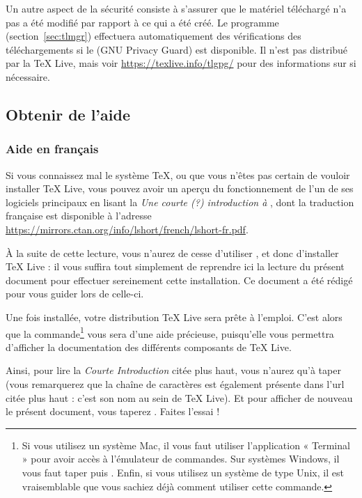 \documentclass[german, english, french]{article}
\renewcommand{\TL}{\TeX{} Live\xspace}%
\begin{document}
Un autre aspect de la sécurité consiste à s'assurer que le matériel téléchargé
n'a pas a été modifié par rapport à ce qui a été créé. Le programme 
(section~\ref{sec:tlmgr}) effectuera automatiquement des vérifications des
téléchargements si le  (GNU Privacy Guard) est disponible. Il n'est
pas distribué par la \TL, mais voir \url{https://texlive.info/tlgpg/} pour des
informations sur  si nécessaire.

\subsection{Obtenir de l'aide}
\label{sec:help}
\subsubsection{Aide en français}
Si vous connaissez mal le système \TeX{}, ou que vous n'êtes pas certain de
vouloir installer \TL{}, vous pouvez avoir un aperçu du fonctionnement de l'un
de ses logiciels principaux en lisant la \emph{Une courte (\string?)
  introduction à \LaTeXe{}}, dont la traduction française est disponible
à l'adresse \url{https://mirrors.ctan.org/info/lshort/french/lshort-fr.pdf}.

À la suite de cette lecture, vous n'aurez de cesse d'utiliser \LaTeXe{}, et donc
d'installer \TL{} : il vous suffira tout simplement de reprendre ici la lecture
du présent document pour effectuer sereinement cette installation.  Ce document
a été rédigé pour vous guider lors de celle-ci.

Une fois installée, votre distribution \TL{} sera prête à l'emploi.  C'est alors
que la commande\footnote{Si vous utilisez un système Mac, il vous faut utiliser
  l'application « Terminal » pour avoir accès à l'émulateur de commandes.  Sur
  systèmes Windows, il vous faut taper  puis .  Enfin, si
  vous utilisez un système de type Unix, il est vraisemblable que vous sachiez
  déjà comment utiliser cette commande.}  vous sera d'une aide
précieuse, puisqu'elle vous permettra d'afficher la documentation des différents
composants de \TL{}.

Ainsi, pour lire la \emph{Courte Introduction} citée plus haut, vous n'aurez
qu'à taper  (vous remarquerez que la chaîne de caractères
 est également présente dans l'url citée plus haut : c'est son
nom au sein de \TL{}).  Et pour afficher de nouveau le présent document, vous
taperez . Faites l'essai !
\end{document}
